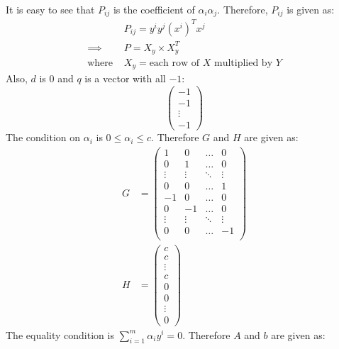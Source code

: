 \documentclass[11pt]{article}
\begin{document}
It is easy to see that $P_{ij}$ is the coefficient of $\alpha_i \alpha_j$. Therefore, $P_{ij}$ is given as:
\begin{equation}
  \begin{split}
    &P_{ij} = y^i y^j (x^i)^T x^j\\
    \implies &P = X_y\times X_y^T\\
    \text{where }&X_y = \text{each row of }X\text{ multiplied by }Y
  \end{split}
\end{equation}
Also, $d$ is $0$ and $q$ is a vector with all $-1$:
\begin{equation}
  \begin{pmatrix}
    -1\\
    -1\\
    \vdots\\
    -1
  \end{pmatrix}
\end{equation}
The condition on $\alpha_i$ is $0 \leq \alpha_i \leq c$. Therefore $G$ and $H$ are given as:
\begin{equation}
  \begin{split}
    G &=
    \begin{pmatrix}
      1 & 0 & \ldots & 0\\
      0 & 1 & \ldots & 0\\
      \vdots & \vdots & \ddots & \vdots\\
      0 & 0 & \ldots & 1\\
      -1 & 0 & \ldots & 0\\
      0 & -1 & \ldots & 0\\
      \vdots & \vdots & \ddots & \vdots\\
      0 & 0 & \ldots & -1\\
    \end{pmatrix}\\
    H &=
    \begin{pmatrix}
      c\\
      c\\
      \vdots\\
      c\\
      0\\
      0\\
      \vdots\\
      0
    \end{pmatrix}
  \end{split}
\end{equation}
The equality condition is $\sum_{i=1}^m \alpha_i y^i = 0$. Therefore $A$ and $b$ are given as:
\end{document}
